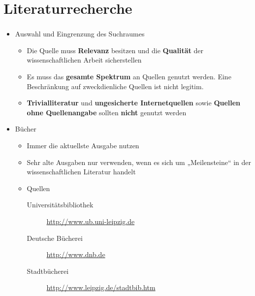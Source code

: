 \documentclass[aspectratio=169]{beamer}
\begin{document}
\section{Literaturrecherche}
\begin{frame}
  \frametitle{\insertsection}%
  \framesubtitle{\insertsubsection}%
  \begin{itemize}
   \item Auswahl und Eingrenzung des Suchraumes
   \begin{itemize}
    \item Die Quelle muss \textbf{Relevanz} besitzen und die \textbf{Qualität} der wissenschaftlichen Arbeit sicherstellen
    \item Es muss das \textbf{gesamte Spektrum} an Quellen genutzt werden. Eine Beschränkung auf zweckdienliche Quellen ist nicht legitim.
    \item \textbf{Trivialliteratur} und \textbf{ungesicherte Internetquellen} sowie \textbf{Quellen ohne Quellenangabe} sollten \textbf{nicht} genutzt werden
   \end{itemize}
   \item Bücher
   \begin{itemize}
    \item Immer die aktuellste Ausgabe nutzen
    \item Sehr alte Ausgaben nur verwenden, wenn es sich um „Meilensteine“ in der wissenschaftlichen Literatur handelt
    \item Quellen
    \begin{description}
     \item[Universitätsbibliothek] \url{http://www.ub.uni-leipzig.de}
     \item[Deutsche Bücherei] \url{http://www.dnb.de}
     \item[Stadtbücherei] \url{http://www.leipzig.de/stadtbib.htm}
    \end{description}
   \end{itemize}
  \end{itemize}
\end{frame}
\end{document}
